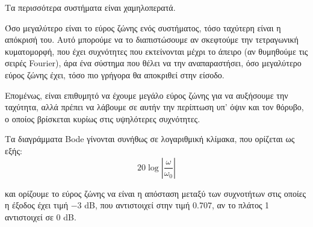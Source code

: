 \documentclass[11pt,a4paper,notitlepage,fleqn,final]{article}
\begin{document}
Τα περισσότερα συστήματα είναι χαμηλοπερατά.

Όσο μεγαλύτερο είναι το εύρος ζώνης ενός συστήματος, τόσο ταχύτερη είναι η απόκρισή του.
Αυτό μπορούμε να το διαπιστώσουμε αν σκεφτούμε την τετραγωνική κυματομορφή,
που έχει συχνότητες που εκτείνονται μέχρι το άπειρο (αν θυμηθούμε τις σειρές Fourier),
άρα ένα σύστημα που θέλει να την αναπαραστήσει, όσο μεγαλύτερο εύρος ζώνης έχει,
τόσο πιο γρήγορα θα αποκριθεί στην είσοδο.


Επομένως, είναι επιθυμητό να έχουμε μεγάλο εύρος ζώνης για να αυξήσουμε την ταχύτητα, αλλά
πρέπει να λάβουμε σε αυτήν την περίπτωση υπ' όψιν και τον θόρυβο, ο οποίος βρίσκεται κυρίως
στις υψηλότερες συχνότητες.

Τα διαγράμματα Bode γίνονται συνήθως σε λογαριθμική κλίμακα, που ορίζεται ως εξής:
\[
20\log\left\lvert \frac{\omega}{\omega_0} \right\rvert
\]


και ορίζουμε το εύρος ζώνης να είναι η απόσταση μεταξύ των συχνοτήτων στις οποίες η έξοδος
έχει τιμή \(-3\) dB, που αντιστοιχεί στην τιμή 0.707, αν το πλάτος 1 αντιστοιχεί σε 0 dB.
\end{document}
